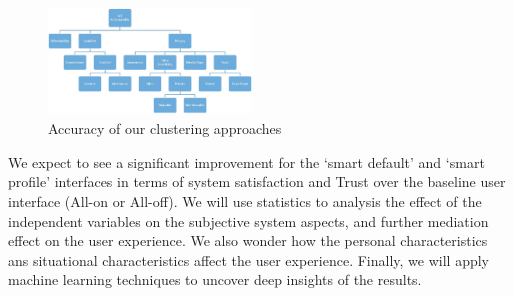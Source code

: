 \begin{figure}
	\centering
	\includegraphics[width=0.48\textwidth]{figures/model.pdf}
	\caption{Accuracy of our clustering approaches}
	\label{fig:model}
\end{figure}

We expect to see a significant improvement for the `smart default' and `smart profile' interfaces in terms of system satisfaction and Trust over the baseline user interface (All-on or All-off). We will use statistics to analysis the effect of the independent variables on the subjective system aspects, and further mediation effect on the user experience. We also wonder how the personal characteristics ans situational characteristics affect the user experience. Finally, we will apply machine learning techniques to uncover deep insights of the results.
